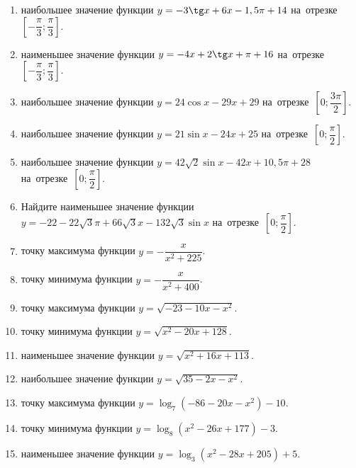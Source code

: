 \documentclass[a4paper,10pt]{article}
\begin{document}
\begin{enumerate}
\item {} наибольшее значение функции $y=-3\tg x +6x-1,5\pi +14$ на~отрезке~$\left[-\dfrac{\pi}{3};\dfrac{\pi}{3}\right]$.

\item {} наименьшее значение функции $y=-4x +2\tg x+\pi+16$ на~отрезке~$\left[-\dfrac{\pi}{3};\dfrac{\pi}{3}\right]$.

\item {} наибольшее значение функции $y=24\cos x-29x+29$ на~отрезке~$\left[0;\dfrac{3\pi}{2}\right]$.

\item {} наибольшее значение функции $y=21\sin x-24x+25$ на~отрезке~$\left[0;\dfrac{\pi}{2}\right]$.

\item {} наибольшее значение функции $y=42\sqrt{2}\sin x-42x+10,5\pi +28$ на~отрезке~$\left[0;\dfrac{\pi}{2}\right]$.

\item Найдите наименьшее значение функции $y=-22-22\sqrt{3}\pi+66\sqrt{3}x-132\sqrt{3}\sin x$ на~отрезке~$\left[0;\dfrac{\pi}{2}\right]$.

\item {} точку максимума функции $y=-\dfrac{x}{ x^2 +225}$.

\item {} точку минимума функции $y=-\dfrac{x}{ x^2 +400}$.

\item {} точку максимума функции $y=\sqrt{-23-10x-x^2}$.

\item {} точку минимума функции $y=\sqrt{x^2-20x+128}$.

\item {} наименьшее значение функции $y=\sqrt{x^2+16x+113}$.

\item {} наибольшее значение функции $y=\sqrt{35-2x-x^2}$.

\item {} точку максимума функции $y=\log_7\left(-86-20x-x^2\right)-10$.

\item {} точку минимума функции $y=\log_8\left(x^2-26x+177\right)-3$.

\item {} наименьшее значение функции $y=\log_3\left(x^2-28x+205\right)+5$.


\end{enumerate}
\end{document}
